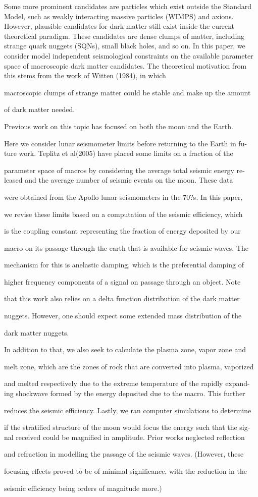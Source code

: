 Some more prominent candidates are particles which exist outside the Standard Model, such as weakly interacting massive particles (WIMPS) and axions. However, plausible candidates for dark matter still exist inside the current theoretical paradigm. These candidates are dense clumps of matter, including strange quark nuggets (SQNs), small black holes, and so on. In this paper, we consider model independent seismological constraints on the available parameter space of macroscopic dark matter candidates. The theoretical motivation from this stems from the work of Witten (1984), in which

macroscopic clumps of strange matter could be stable and make up the amount

of dark matter needed.

Previous work on this topic has focused on both the moon and the Earth.

Here we consider lunar seismometer limits before returning to the Earth in fu-
ture work. Teplitz et al(2005) have placed some limits on a fraction of the

parameter space of macros by considering the average total seismic energy re-
leased and the average number of seismic events on the moon. These data

were obtained from the Apollo lunar seismometers in the 70?s. In this paper,

we revise these limits based on a computation of the seismic efficiency, which

is the coupling constant representing the fraction of energy deposited by our

macro on its passage through the earth that is available for seismic waves. The

mechanism for this is anelastic damping, which is the preferential damping of

higher frequency components of a signal on passage through an object. Note

that this work also relies on a delta function distribution of the dark matter

nuggets. However, one should expect some extended mass distribution of the

dark matter nuggets.

In addition to that, we also seek to calculate the plasma zone, vapor zone and

melt zone, which are the zones of rock that are converted into plasma, vaporized

and melted respectively due to the extreme temperature of the rapidly expand-
ing shockwave formed by the energy deposited due to the macro. This further

reduces the seismic efficiency. Lastly, we ran computer simulations to determine

if the stratified structure of the moon would focus the energy such that the sig-
nal received could be magnified in amplitude. Prior works neglected reflection

and refraction in modelling the passage of the seismic waves. (However, these

focusing effects proved to be of minimal significance, with the reduction in the

seismic efficiency being orders of magnitude more.)